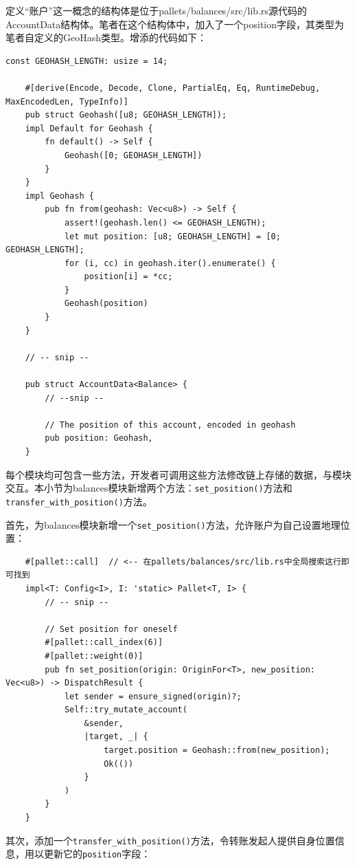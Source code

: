 定义“账户”这一概念的结构体是位于pallets/balances/src/lib.rs源代码的AccountData结构体。笔者在这个结构体中，加入了一个position字段，其类型为笔者自定义的GeoHash类型。增添的代码如下：

\begin{lstlisting}[caption={为balances模块新增代码}]
    const GEOHASH_LENGTH: usize = 14;

    #[derive(Encode, Decode, Clone, PartialEq, Eq, RuntimeDebug, MaxEncodedLen, TypeInfo)]
    pub struct Geohash([u8; GEOHASH_LENGTH]);
    impl Default for Geohash {
        fn default() -> Self {
            Geohash([0; GEOHASH_LENGTH])
        }
    }
    impl Geohash {
        pub fn from(geohash: Vec<u8>) -> Self {
            assert!(geohash.len() <= GEOHASH_LENGTH);
            let mut position: [u8; GEOHASH_LENGTH] = [0; GEOHASH_LENGTH];
            for (i, cc) in geohash.iter().enumerate() {
                position[i] = *cc;
            }
            Geohash(position)
        }
    }

    // -- snip --

    pub struct AccountData<Balance> {
        // --snip --

        // The position of this account, encoded in geohash
        pub position: Geohash,
    }
\end{lstlisting}

每个模块均可包含一些方法，开发者可调用这些方法修改链上存储的数据，与模块交互。本小节为balances模块新增两个方法：\verb|set_position()|方法和\verb|transfer_with_position()|方法。

首先，为balances模块新增一个\verb|set_position()|方法，允许账户为自己设置地理位置：

\begin{lstlisting}
    #[pallet::call]  // <-- 在pallets/balances/src/lib.rs中全局搜索这行即可找到
    impl<T: Config<I>, I: 'static> Pallet<T, I> {
        // -- snip --

        // Set position for oneself
        #[pallet::call_index(6)]
        #[pallet::weight(0)]
        pub fn set_position(origin: OriginFor<T>, new_position: Vec<u8>) -> DispatchResult {
            let sender = ensure_signed(origin)?;
            Self::try_mutate_account(
                &sender,
                |target, _| {
                    target.position = Geohash::from(new_position);
                    Ok(())
                }
            )
        }
    }
\end{lstlisting}

其次，添加一个\verb|transfer_with_position()|方法，令转账发起人提供自身位置信息，用以更新它的\verb|position|字段：


